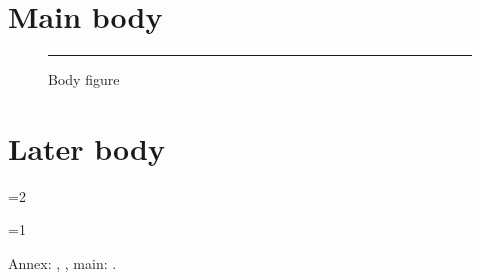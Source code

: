 \documentclass{article}
\begin{document}
\section{Main body}\label{sec:main}
\begin{figure}[ht]\centering\rule{1cm}{1cm}\caption{Body figure}\label{fig:main}\end{figure}
\section{Later body}\label{sec:later}
\ifnum\value{section}=2\else\PackageError{pxANX-test}{Main section changed}{}\fi
\pxPrintAnnexes
\ifnum\value{pxannex}=1\else\PackageError{pxANX-test}{Expected one annex}{}\fi
Annex: , , main: .
\end{document}
